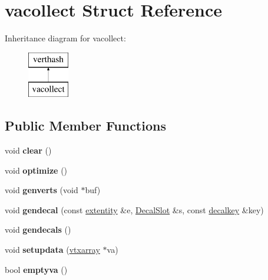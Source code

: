 \hypertarget{structvacollect}{}\section{vacollect Struct Reference}
\label{structvacollect}
Inheritance diagram for vacollect\+:\begin{figure}[H]
\begin{center}
\leavevmode
\includegraphics[height=2.000000cm]{structvacollect}
\end{center}
\end{figure}
\subsection*{Public Member Functions}
\begin{DoxyCompactItemize}
\item 
\mbox{\label{structvacollect_a3ad850ce9d9e1f7ff3c6582767efa518}} 
void {\bfseries clear} ()
\item 
\mbox{\label{structvacollect_a40d1251c913432b6165ff14123e65d42}} 
void {\bfseries optimize} ()
\item 
\mbox{\label{structvacollect_a109a860a7eca8546bff074465271fadd}} 
void {\bfseries genverts} (void $\ast$buf)
\item 
\mbox{\label{structvacollect_ac3c4c253b8ebdaf534bb85e495e4503a}} 
void {\bfseries gendecal} (const \hyperlink{structextentity}{extentity} \&e, \hyperlink{struct_decal_slot}{Decal\+Slot} \&s, const \hyperlink{structdecalkey}{decalkey} \&key)
\item 
\mbox{\label{structvacollect_a59f39e70e95b45395c0742bea126f425}} 
void {\bfseries gendecals} ()
\item 
\mbox{\label{structvacollect_a688cc8e42db54dbb55171dbefb845c7f}} 
void {\bfseries setupdata} (\hyperlink{structvtxarray}{vtxarray} $\ast$va)
\item 
\mbox{\label{structvacollect_ab10e6f81f32414c6257feb368f440800}} 
bool {\bfseries emptyva} ()
\end{DoxyCompactItemize}
